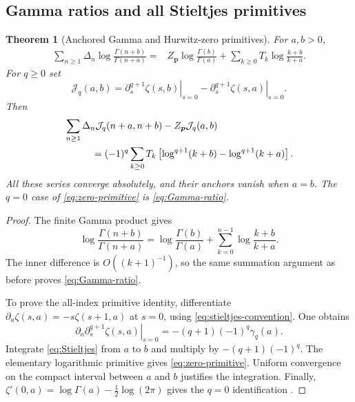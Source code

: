 \documentclass[11pt,letterpaper]{article}
\numberwithin{equation}{section}
\newtheorem{theorem}{Theorem}[section]
\theoremstyle{definition}\newtheorem{definition}[theorem]{Definition}
\theoremstyle{remark}\newtheorem{remark}[theorem]{Remark}
\begin{document}
\subsection{Gamma ratios and all Stieltjes primitives}

\begin{theorem}[Anchored Gamma and Hurwitz-zero primitives]\label{thm:primitives}
For $a,b>0$,
\begin{equation}\label{eq:Gamma-ratio}
\begin{split}
 \sum_{n\ge1}\Delta_n\log\frac{\Gamma(n+b)}{\Gamma(n+a)}
 ={}&Z_{\boldsymbol p}\log\frac{\Gamma(b)}{\Gamma(a)}
       +\sum_{k\ge0}T_k\log\frac{k+b}{k+a}.
\end{split}
\end{equation}
For $q\ge0$ set
\[
 \mathcal J_q(a,b)=\left.\partial_s^{q+1}\zeta(s,b)\right|_{s=0}
             -\left.\partial_s^{q+1}\zeta(s,a)\right|_{s=0}.
\]
Then
\begin{equation}\label{eq:zero-primitive}
\begin{split}
 &\sum_{n\ge1}\Delta_n\mathcal J_q(n+a,n+b)-Z_{\boldsymbol p}\mathcal J_q(a,b)\\
 &\hspace{10mm}=(-1)^q\sum_{k\ge0}T_k
          \left[\log^{q+1}(k+b)-\log^{q+1}(k+a)\right].
\end{split}
\end{equation}
All these series converge absolutely, and their anchors vanish when
$a=b$. The $q=0$ case of \eqref{eq:zero-primitive} is
\eqref{eq:Gamma-ratio}.
\end{theorem}

\begin{proof}
The finite Gamma product gives
\[
 \log\frac{\Gamma(n+b)}{\Gamma(n+a)}
 =\log\frac{\Gamma(b)}{\Gamma(a)}
                   +\sum_{k=0}^{n-1}\log\frac{k+b}{k+a}.
\]
The inner difference is $O((k+1)^{-1})$, so the same summation
argument as before proves \eqref{eq:Gamma-ratio}.

To prove the all-index primitive identity, differentiate
$\partial_a\zeta(s,a)=-s\zeta(s+1,a)$ at $s=0$, using
\eqref{eq:stieltjes-convention}. One obtains
\begin{equation}\label{eq:zero-derivative}
 \partial_a\left.\partial_s^{q+1}\zeta(s,a)\right|_{s=0}
 =-(q+1)(-1)^q\gamma_q(a).
\end{equation}
Integrate \eqref{eq:Stieltjes} from $a$ to $b$ and multiply by
$-(q+1)(-1)^q$. The elementary logarithmic primitive gives
\eqref{eq:zero-primitive}. Uniform convergence on the compact
interval between $a$ and $b$ justifies the integration. Finally,
$\zeta'(0,a)=\log\Gamma(a)-\frac12\log(2\pi)$ gives the
$q=0$ identification \cite{DLMF}.
\end{proof}
\end{document}
